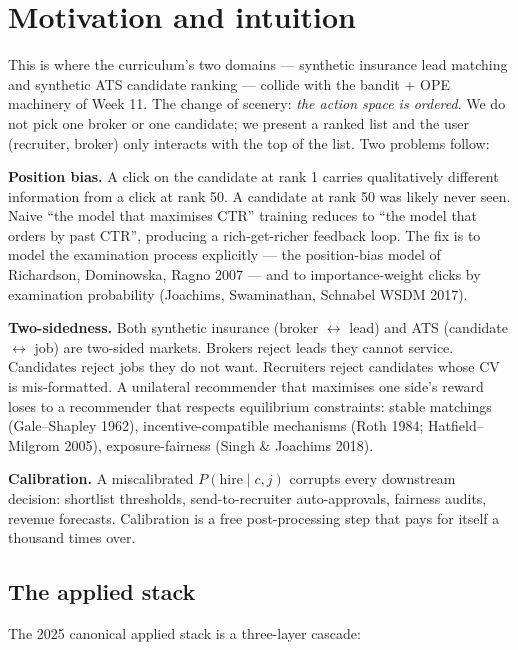 \documentclass[11pt,oneside]{scrbook}
\begin{document}
\chapter{Motivation and intuition}

This is where the curriculum's two domains --- synthetic insurance lead matching
and synthetic ATS candidate ranking --- collide with the bandit + OPE machinery
of Week 11. The change of scenery: \emph{the action space is ordered}. We
do not pick one broker or one candidate; we present a ranked list and the
user (recruiter, broker) only interacts with the top of the list. Two
problems follow:

\textbf{Position bias.} A click on the candidate at rank 1 carries
qualitatively different information from a click at rank 50. A candidate at
rank 50 was likely never seen. Naive ``the model that maximises CTR''
training reduces to ``the model that orders by past CTR'', producing a
rich-get-richer feedback loop. The fix is to model the examination process
explicitly --- the position-bias model of Richardson, Dominowska, Ragno 2007
--- and to importance-weight clicks by examination probability (Joachims,
Swaminathan, Schnabel WSDM 2017).

\textbf{Two-sidedness.} Both synthetic insurance (broker $\leftrightarrow$ lead) and ATS
(candidate $\leftrightarrow$ job) are two-sided markets. Brokers reject
leads they cannot service. Candidates reject jobs they do not want.
Recruiters reject candidates whose CV is mis-formatted. A unilateral
recommender that maximises one side's reward loses to a recommender that
respects equilibrium constraints: stable matchings (Gale--Shapley 1962),
incentive-compatible mechanisms (Roth 1984; Hatfield--Milgrom 2005),
exposure-fairness (Singh \& Joachims 2018).

\textbf{Calibration.} A miscalibrated $P(\text{hire} \mid c, j)$ corrupts
every downstream decision: shortlist thresholds, send-to-recruiter
auto-approvals, fairness audits, revenue forecasts. Calibration is a free
post-processing step that pays for itself a thousand times over.

\section{The applied stack}

The 2025 canonical applied stack is a three-layer cascade:
\end{document}
